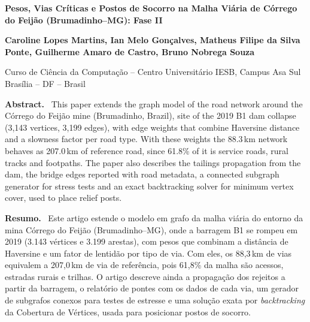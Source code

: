 \documentclass[12pt,a4paper]{article}
\newenvironment{sbcabstract}[1]%
  {\list{}{\leftmargin=0.8cm\rightmargin=0.8cm\topsep=0pt\parsep=0pt}\item[]\textbf{#1.}\ }%
  {\endlist}
\begin{document}
\makeatletter\let\@afterindenttrue\@afterindentfalse\makeatother

\begin{center}
  \vspace*{12pt}
  {\fontsize{16}{19}\selectfont\bfseries
   Pesos, Vias Críticas e Postos de Socorro na Malha Viária de Córrego do Feijão (Brumadinho--MG): Fase II\par}
  \vspace{12pt}
  {\bfseries Caroline Lopes Martins, Ian Melo Gonçalves, Matheus Filipe da Silva Ponte, Guilherme Amaro de Castro, Bruno Nobrega Souza\par}
  \vspace{12pt}
  Curso de Ciência da Computação -- Centro Universitário IESB, Campus Asa Sul\\ Brasília -- DF -- Brasil\par
\end{center}

\begin{sbcabstract}{Abstract}
This paper extends the graph model of the road network around the Córrego do Feijão mine (Brumadinho, Brazil), site of the 2019 B1 dam collapse (3,143 vertices, 3,199 edges), with edge weights that combine Haversine distance and a slowness factor per road type. With these weights the 88.3\,km network behaves as 207.0\,km of reference road, since 61.8\% of it is service roads, rural tracks and footpaths. The paper also describes the tailings propagation from the dam, the bridge edges reported with road metadata, a connected subgraph generator for stress tests and an exact backtracking solver for minimum vertex cover, used to place relief posts.
\end{sbcabstract}

\begin{sbcabstract}{Resumo}
Este artigo estende o modelo em grafo da malha viária do entorno da mina Córrego do Feijão (Brumadinho--MG), onde a barragem B1 se rompeu em 2019 (3.143 vértices e 3.199 arestas), com pesos que combinam a distância de Haversine e um fator de lentidão por tipo de via. Com eles, os 88,3\,km de vias equivalem a 207,0\,km de via de referência, pois 61,8\% da malha são acessos, estradas rurais e trilhas. O artigo descreve ainda a propagação dos rejeitos a partir da barragem, o relatório de pontes com os dados de cada via, um gerador de subgrafos conexos para testes de estresse e uma solução exata por \emph{backtracking} da Cobertura de Vértices, usada para posicionar postos de socorro.
\end{sbcabstract}
\end{document}
